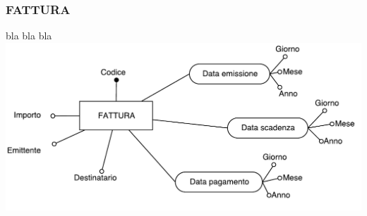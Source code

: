 \subsubsection{FATTURA}
bla bla bla
\includegraphics[width=0.7\linewidth]{./immagini/fattura.pdf}



%
%
%
%
%
%
%
